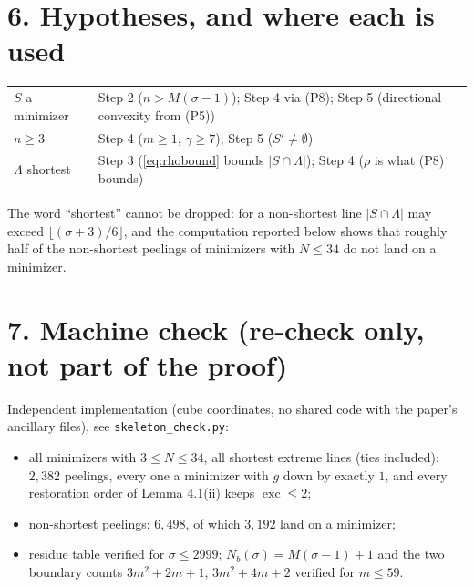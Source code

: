 \documentclass[11pt]{article}
\theoremstyle{plain}
\theoremstyle{remark}
\DeclareMathOperator{\exc}{exc}
\begin{document}
\section*{6. Hypotheses, and where each is used}

\begin{center}
\begin{tabular}{@{}lp{9.5cm}@{}}
\toprule
\(S\) a minimizer & Step 2 (\(n>M(\sigma-1)\)); Step 4 via (P8); Step 5 (directional convexity from (P5)) \\
\(n\ge3\) & Step 4 (\(m\ge1\), \(\gamma\ge7\)); Step 5 (\(S'\neq\emptyset\)) \\
\(\Lambda\) shortest & Step 3 (\eqref{eq:rhobound} bounds \(|S\cap\Lambda|\)); Step 4 (\(\rho\) is what (P8) bounds) \\
\bottomrule
\end{tabular}
\end{center}

The word ``shortest'' cannot be dropped: for a non-shortest line \(|S\cap\Lambda|\) may exceed
\(\lfloor(\sigma+3)/6\rfloor\), and the computation reported below shows that roughly half of
the non-shortest peelings of minimizers with \(N\le34\) do not land on a minimizer.

\section*{7. Machine check (re-check only, not part of the proof)}

Independent implementation (cube coordinates, no shared code with the paper's ancillary
files), see \texttt{skeleton\_check.py}:
\begin{itemize}
\item all minimizers with \(3\le N\le34\), all shortest extreme lines (ties included):
\(2{,}382\) peelings, every one a minimizer with \(g\) down by exactly \(1\), and every
restoration order of Lemma 4.1(ii) keeps \(\exc\le2\);
\item non-shortest peelings: \(6{,}498\), of which \(3{,}192\) land on a minimizer;
\item residue table verified for \(\sigma\le2999\); \(N_{b}(\sigma)=M(\sigma-1)+1\) and the
two boundary counts \(3m^{2}+2m+1\), \(3m^{2}+4m+2\) verified for \(m\le59\).
\end{itemize}
\end{document}
